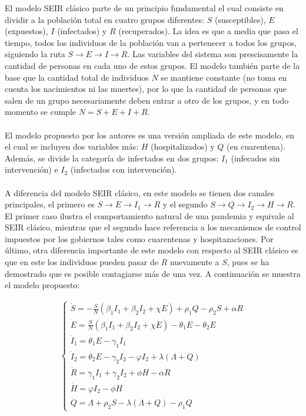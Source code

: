 \documentclass[conference]{IEEEtran}
\begin{document}
El modelo SEIR clásico parte de un principio fundamental el cual consiste en dividir a
la población total en cuatro grupos diferentes: $S$ (susceptibles), $E$ (expuestos),
$I$ (infectados) y $R$ (recuperados). La idea es que a media que pasa el tiempo, 
todos los individuos de la población van a pertenecer a todos los grupos, siguiendo la 
ruta $S \rightarrow E \rightarrow I \rightarrow R$. Las variables del sistema son
prescisamente la cantidad de personas en cada uno de estos grupos. El modelo también 
parte de la base que la cantidad total de individuos $N$ se mantiene constante (no toma en
cuenta los nacimientos ni las muertes), por lo que la cantidad de personas que salen de
un grupo necesariamente deben entrar a otro de los grupos, y en todo momento se cumple
$N = S + E + I + R$.
\\\\
El modelo propuesto por los autores es una versión ampliada de este modelo, en el cual 
se incluyen dos variables más: $H$ (hospitalizados) y $Q$ (en cuarentena). Además, se
divide la categoría de infectados en dos grupos: $I_1$ (infecados sin intervención)
e $I_2$ (infectados con intervención).
\\\\
A diferencia del modelo SEIR clásico, en este modelo se tienen dos canales principales,
el primero es $S \rightarrow E \rightarrow I_1 \rightarrow R$ y el segundo
$S \rightarrow Q \rightarrow I_2 \rightarrow H \rightarrow R$. El primer 
caso ilustra el comportamiento natural de una pandemia y equivale al SEIR clásico, 
mientras que el segundo hace referencia a los mecanismos de control impuestos por los
gobiernos tales como cuarentenas y hospitazaciones. Por último, otra diferencia 
importante de este modelo con respecto al SEIR clásico es que en este los individuos
pueden pasar de $R$ nuevamente a $S$, pues se ha demostrado que es posible
contagiarse más de una vez. A continuación se muestra el modelo propuesto:

\begin{equation}   
    \begin{aligned}
    \left\{
        \begin{array}{l} 
        \dot{S} = - \frac{S}{N}\left( {{\beta _1}{I_1} + {\beta _2}{I_2} + \chi E} \right) + {\rho _1}Q - {\rho _2}S + \alpha R
        \\ 
        \dot{ E} = \frac{S}{N}\left( {{\beta _1}{I_1} + {\beta _2}{I_2} + \chi E} \right) - {\theta _1}E - {\theta _2}E
        \\ 
        {\dot{I}}_1 = {\theta _1}E - {\gamma _1}{I_1}
        \\ 
        \dot{I}_2 = {\theta _2}E - {\gamma _2}{I_2} - \varphi {I_2} + \lambda \left( \varLambda + Q \right) 
        \\ 
        \dot{R} = {\gamma _1}{I_1} + {\gamma _2}{I_2} + \phi H - \alpha R
        \\ 
        \dot{H} = \varphi {I_2} - \phi H
        \\ 
        \dot{Q} = \varLambda + {\rho _2}S - \lambda \left( {\varLambda + Q} \right) - {\rho _1}Q 
    \end{array} 
    \right.
    \end{aligned}
\end{equation}
\end{document}
